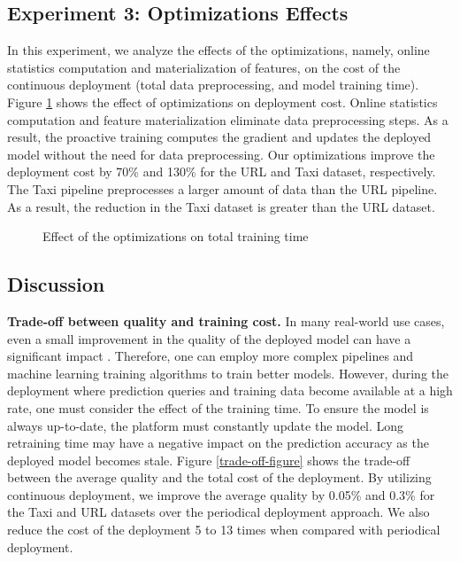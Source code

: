 \subsection{Experiment 3: Optimizations Effects}
In this experiment, we analyze the effects of the optimizations, namely, online statistics computation and materialization of features, on the cost of the continuous deployment (total data preprocessing, and model training time).
Figure \ref{optimization-effect} shows the effect of optimizations on deployment cost.
Online statistics computation and feature materialization eliminate data preprocessing steps.
As a result, the proactive training computes the gradient and updates the deployed model without the need for data preprocessing.
Our optimizations improve the deployment cost by 70\% and 130\% for the URL and Taxi dataset, respectively.
The Taxi pipeline preprocesses a larger amount of data than the URL pipeline.
As a result, the reduction in the Taxi dataset is greater than the URL dataset.
\begin{figure}[h!]
\centering
\resizebox{\columnwidth}{!}{}
\caption{Effect of the optimizations on total training time}
\label{optimization-effect}
\end{figure}
\subsection{Discussion} \label{subsec:discussion}
\textbf{Trade-off between quality and training cost.}
In many real-world use cases, even a small improvement in the quality of the deployed model can have a significant impact  \cite{ling2017model}.
Therefore, one can employ more complex pipelines and machine learning training algorithms to train better models.
However, during the deployment where prediction queries and training data become available at a high rate, one must consider the effect of the training time.
To ensure the model is always up-to-date, the platform must constantly update the model.
Long retraining time may have a negative impact on the prediction accuracy as the deployed model becomes stale.
Figure \ref{trade-off-figure} shows the trade-off between the average quality and the total cost of the deployment.
By utilizing continuous deployment, we improve the average quality by 0.05\% and 0.3\% for the Taxi and URL datasets over the periodical deployment approach.
We also reduce the cost of the deployment 5 to 13 times when compared with periodical deployment.


